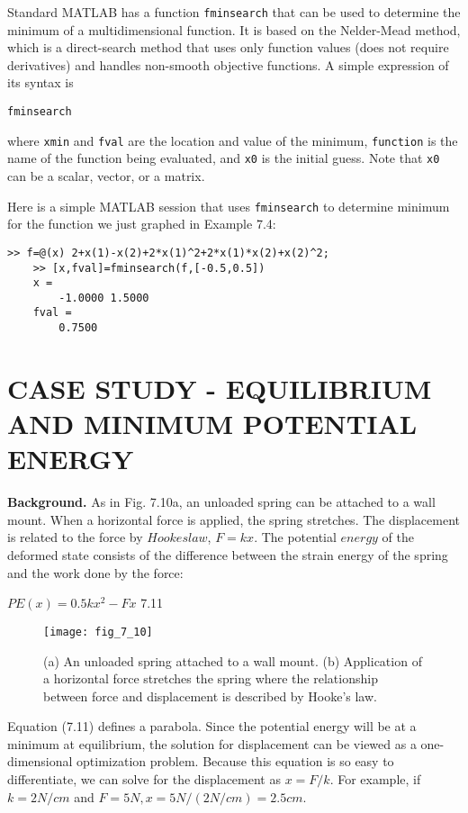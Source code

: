 \documentclass[../main.tex]{subfiles}
\begin{document}
\noindent Standard MATLAB has a function \texttt{fminsearch} that can be used to determine the minimum
of a multidimensional function. It is based on the Nelder-Mead method, which is a
direct-search method that uses only function values (does not require derivatives) and
handles non-smooth objective functions. A simple expression of its syntax is
\smallskip

\texttt{\texttt{fminsearch}}
\smallskip

\noindent where \texttt{xmin} and \texttt{fval} are the location and value of the minimum, \texttt{function} is the name of
the function being evaluated, and \texttt{x0} is the initial guess. Note that \texttt{x0} can be a scalar, vector,
or a matrix.

Here is a simple MATLAB session that uses \texttt{fminsearch} to determine minimum for
the function we just graphed in Example 7.4:

\begin{lstlisting}[numbers=none,frame=none]
	>> f=@(x) 2+x(1)-x(2)+2*x(1)^2+2*x(1)*x(2)+x(2)^2;
	>> [x,fval]=fminsearch(f,[-0.5,0.5])
	x =
		-1.0000 1.5000
	fval =
		0.7500
\end{lstlisting}

\section{\textbf{CASE STUDY} - EQUILIBRIUM AND MINIMUM POTENTIAL ENERGY}
\label{sec:sec_7_4}

\textbf{Background.} As in Fig. 7.10a, an unloaded spring can be attached to a wall mount.
When a horizontal force is applied, the spring stretches. The displacement is related to the
force by $Hookes law$, $F = kx$. The potential $energy$ of the deformed state consists of the difference
between the strain energy of the spring and the work done by the force:\medskip

$PE(x) = 0.5kx^2-Fx$ \hfill{7.11}
\medskip

\begin{figure}[H]
	\centering
	\texttt{[image: fig\_7\_10]}
	\caption{\textsf{(a) An unloaded spring attached to a wall mount. (b) Application of a horizontal force stretches
	the spring where the relationship between force and displacement is described by Hooke's law.}}
	\label{fig:fig_7_10}
\end{figure}

Equation (7.11) defines a parabola. Since the potential energy will be at a minimum at
equilibrium, the solution for displacement can be viewed as a one-dimensional optimization
problem. Because this equation is so easy to differentiate, we can solve for the displacement
as $x = F/k$. For example, if $k = 2 N/cm$ and $F = 5 N, x = 5N/(2 N/cm) = 2.5 cm.$
\end{document}
